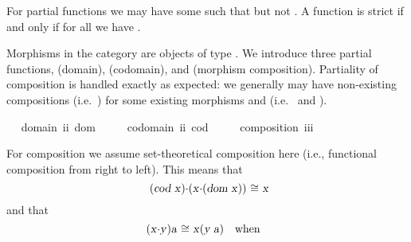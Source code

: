 \begin{isabellebody}
\begin{isamarkuptext}
For partial functions  we may have some  such that  but not
 . A function  is strict  if  and only if for all  
we have .%
\end{isamarkuptext}\isamarkuptrue%
%
\isamarkuptrue%
%
\begin{isamarkuptext}%
Morphisms in the category are objects of type . We introduce three partial functions, 
 (domain),  (codomain), and \isa{{\isasymcdot}} (morphism composition). 
Partiality of composition is handled exactly as expected: we generally may have 
non-existing compositions  (i.e.~) for some existing  
morphisms  and  (i.e.~ and ).%
\end{isamarkuptext}\isamarkuptrue%
\isamarkupfalse%
\ \isanewline
\ domain{\isacharcolon}{\isacharcolon}\ {\isachardoublequoteopen}i{\isasymRightarrow}i{\isachardoublequoteclose}\ {\isacharparenleft}{\isachardoublequoteopen}dom\ {\isacharunderscore}{\isachardoublequoteclose}\ {\isacharbrackleft}{}{}{}{\isacharbrackright}\ {}{}{}{\isacharparenright}\ \isanewline
\ codomain{\isacharcolon}{\isacharcolon}\ {\isachardoublequoteopen}i{\isasymRightarrow}i{\isachardoublequoteclose}\ {\isacharparenleft}{\isachardoublequoteopen}cod\ {\isacharunderscore}{\isachardoublequoteclose}\ {\isacharbrackleft}{}{}{}{\isacharbrackright}\ {}{}{}{\isacharparenright}\ \isanewline
\ composition{\isacharcolon}{\isacharcolon}\ {\isachardoublequoteopen}i{\isasymRightarrow}i{\isasymRightarrow}i{\isachardoublequoteclose}\ {\isacharparenleft}\ {\isachardoublequoteopen}{\isasymcdot}{\isachardoublequoteclose}\ {}{}{}{\isacharparenright}%
\begin{isamarkuptext}%
For composition \isa{{\isasymcdot}} we assume set-theoretical composition here (i.e., functional 
composition from right to left). This means that
\[\isa{{\isacharparenleft}cod\ x{\isacharparenright}{\isasymcdot}{\isacharparenleft}x{\isasymcdot}{\isacharparenleft}dom\ x{\isacharparenright}{\isacharparenright}\ {\isasymcong}\ x}\] and that \[\isa{{\isacharparenleft}x{\isasymcdot}y{\isacharparenright}a\ {\isasymcong}\ x{\isacharparenleft}y\ a{\isacharparenright}}\quad \text{when}\quad
\]
\end{isamarkuptext}
\end{isabellebody}
